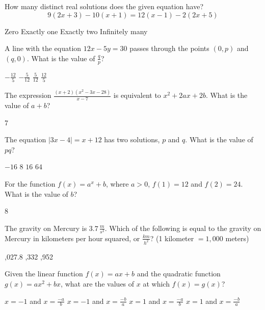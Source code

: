 \newpage




\question[1]
How many distinct real solutions does the given equation have?
\[
  9(2x+3) - 10(x+1) = 12(x-1) - 2(2x+5)
\]
\begin{choices}
  \CorrectChoice Zero
  \choice Exactly one
  \choice Exactly two
  \choice Infinitely many
\end{choices}

\question[1]
A line with the equation $12x - 5y = 30$ passes through the points $(0, p)$ and $(q, 0)$. What is the value of $\frac{q}{p}$?
\begin{choices}
  \choice $-\frac{12}{5}$
  \CorrectChoice $-\frac{5}{12}$
  \choice $\frac{5}{12}$
  \choice $\frac{12}{5}$
\end{choices}

\question[1]
The expression $\frac{(x+2)(x^2-3x-28)}{x-7}$ is equivalent to $x^2 + 2a x + 2b$. What is the value of $a + b$?
\begin{solution}
7
\end{solution}

\question[1]
The equation $|3x-4| = x+12$ has two solutions, $p$ and $q$. What is the value of $pq$?
\begin{choices}
  \CorrectChoice $-16$
  \choice $8$
  \choice $16$
  \choice $64$
\end{choices}

\question[1]
For the function $f(x) = a^x + b$, where $a > 0$, $f(1) = 12$ and $f(2) = 24$. What is the value of $b$?
\begin{solution}
8
\end{solution}

\question[1]
The gravity on Mercury is $3.7\,\frac{m}{s^2}$. Which of the following is equal to the gravity on Mercury in kilometers per hour squared, or $\frac{km}{h^2}$? (1 kilometer $= 1,000$ meters)
\begin{choices}
  ,027.8
  ,332
  ,952
\end{choices}

\question[1]
Given the linear function $f(x) = a x + b$ and the quadratic function $g(x) = a x^2 + b x$, what are the values of $x$ at which $f(x) = g(x)$?
\begin{choices}
  \choice $x = -1$ and $x = \frac{-a}{b}$
  \choice $x = -1$ and $x = \frac{-b}{a}$
  \choice $x = 1$ and $x = \frac{-a}{b}$
  \CorrectChoice $x = 1$ and $x = \frac{-b}{a}$
\end{choices}




